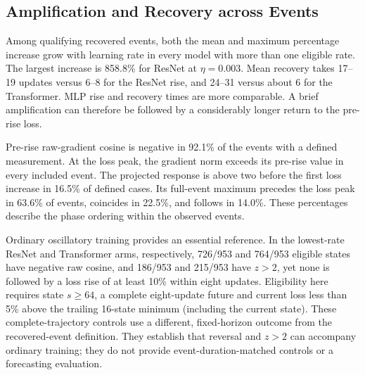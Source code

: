 \subsection{Amplification and Recovery across Events}

Among qualifying recovered events, both the mean and maximum percentage
increase grow with learning rate in every model with more than one eligible
rate. The largest increase is 858.8\% for ResNet at $\eta=0.003$.
Mean recovery takes 17--19 updates versus 6--8 for the ResNet rise,
and 24--31 versus about 6 for the Transformer. MLP rise and recovery
times are more comparable. A brief amplification can therefore be
followed by a considerably longer return to the pre-rise loss.

Pre-rise raw-gradient cosine is negative in 92.1\% of the events with a
defined measurement. At the loss peak, the gradient norm exceeds its
pre-rise value in every included event. The projected response is above
two before the first loss increase in 16.5\% of defined cases.
Its full-event maximum precedes the loss peak in 63.6\% of events,
coincides in 22.5\%, and follows in 14.0\%. These percentages describe
the phase ordering within the observed events.

Ordinary oscillatory training provides an essential reference. In the
lowest-rate ResNet and Transformer arms, respectively, 726/953 and
764/953 eligible states have negative raw cosine, and 186/953 and
215/953 have $z>2$, yet none is followed by a loss rise of at least
10\% within eight updates. Eligibility here requires state $s\ge64$,
a complete eight-update future and current loss less than 5\% above
the trailing 16-state minimum (including the current state).
These complete-trajectory controls use a different, fixed-horizon
outcome from the recovered-event definition. They establish that
reversal and $z>2$ can accompany ordinary training; they do not provide
event-duration-matched controls or a forecasting evaluation.

\begin{table}[tp]
 \caption{Anatomy of recovered spikes with peak increase greater than 10\%.
 Cells report mean $\pm$ sample SD across events; maximum peak increase has
 its own subcolumn. Before denotes a single diagnostic at state $a_i$;
 recovery denotes the event's mean over states $p_i+1,\ldots,c_i$.
 Norm ratios compare loss-peak/pre-rise and recovered/loss-peak endpoints.
 $N$ counts included events; dashes indicate no qualifying event.
 Two initialization events have undefined pre-rise diagnostics, leaving
 46 and 38 observations for those entries in the MLP's middle and highest
 LR rows. No smoothing or averaging across initializations.}
 \label{tab:adam-spike-anatomy}
 \centering
 \footnotesize
 \setlength{\tabcolsep}{1.5pt}
 \renewcommand{\arraystretch}{1.15}
 
\end{table}

